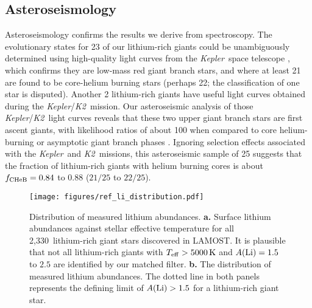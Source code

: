 \documentclass[twocolumn]{aastex62}
\newcommand{\SampleSize}{2,330}
\newcommand\lamost{LAMOST}
\newcommand{\project}[1]{\emph{#1}}
\newcommand{\kepler}{\project{Kepler}}
\newcommand{\ktwo}{\project{K2}}
\begin{document}



\subsection{Asteroseismology}


Asteroseismology confirms the results we derive from spectroscopy. 
The evolutionary states for 23 of our lithium-rich giants could be unambiguously determined
using high-quality light 
curves from the \kepler\ space telescope \citep[Figure~\ref{fig:figure1}c;][]{Mosser_2012,Stello_2013,Vrard_2016}, 
which confirms they are low-mass red giant branch stars, and where at 
least 21 are found to be core-helium burning stars (perhaps 22; the classification of one star is disputed).
Another 2 lithium-rich giants have useful light curves obtained during the \kepler/\ktwo\ mission. 
Our asteroseismic analysis of those \kepler/\ktwo\ light curves reveals that these two upper giant 
branch stars are first ascent giants, with likelihood ratios of about 100 when compared to core
helium-burning or asymptotic giant branch phases \citep{Hekker_2017}. Ignoring selection effects associated with the \kepler\ and \ktwo\ missions, this asteroseismic sample of 25 suggests that the fraction of lithium-rich giants with helium burning cores is about $f_{\rm CHeB} = 0.84$ to $0.88$ ($21/25$ to $22/25$).
 

\begin{figure*}[t]
    \texttt{[image: figures/ref\_li\_distribution.pdf]}
	\caption{Distribution of measured lithium abundances. \textbf{a.} Surface lithium abundances against stellar effective temperature for all \SampleSize\ lithium-rich giant stars discovered in \lamost. It is plausible that not all lithium-rich giants with $T_{\rm eff} > 5000\,{\rm K}$ and $A({\rm Li}) = 1.5$ to $2.5$ are identified by our matched filter. \textbf{b.} The distribution of measured lithium abundances.  The dotted line in both panels represents the defining limit of $A({\rm Li}) > 1.5$ for a lithium-rich giant star.}
    \label{fig:li_distribution}
\end{figure*} 
\end{document}
